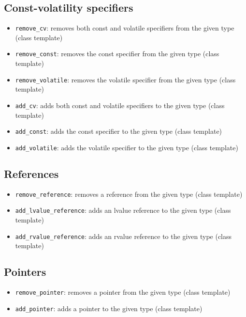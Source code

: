 \documentclass{report}
\begin{document}
        \subsection{Const-volatility specifiers}
        \bigbreak \noindent 
        \begin{itemize}
            \item \texttt{remove\_cv}: removes both const and volatile specifiers from the given type (class template)
            \item \texttt{remove\_const}: removes the const specifier from the given type (class template)
            \item \texttt{remove\_volatile}: removes the volatile specifier from the given type (class template)
            \item \texttt{add\_cv}: adds both const and volatile specifiers to the given type (class template)
            \item \texttt{add\_const}: adds the const specifier to the given type (class template)
            \item \texttt{add\_volatile}: adds the volatile specifier to the given type (class template)
        \end{itemize}

        \pagebreak 
        \subsection{References}
        \begin{itemize}
            \item \texttt{remove\_reference}: removes a reference from the given type (class template)
            \item \texttt{add\_lvalue\_reference}: adds an lvalue reference to the given type (class template)
            \item \texttt{add\_rvalue\_reference}: adds an rvalue reference to the given type (class template)
        \end{itemize}

        \bigbreak \noindent 
        \subsection{Pointers}
        \begin{itemize}
            \item \texttt{remove\_pointer}: removes a pointer from the given type (class template)
            \item \texttt{add\_pointer}: adds a pointer to the given type (class template)
        \end{itemize}
\end{document}
